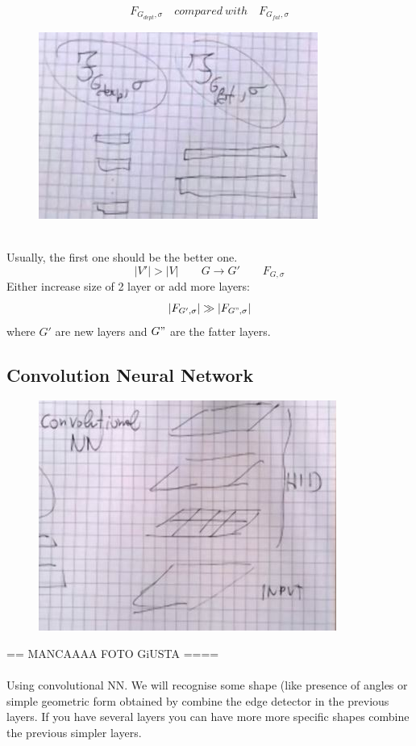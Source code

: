 \documentclass[../main.tex]{subfiles}
\begin{document}
$$
F_{G_{dept},\sigma} \quad compared \ with \quad F_{G_{fat},\sigma}
$$
\begin{figure}[h]
    \centering
    \includegraphics[width=0.4\linewidth]{../img/lez24-img14.JPG}
    \caption{}
\end{figure}\\
Usually, the first one should be the better one. \\
$$ |V'| > |V|  \qquad 
G \rightarrow G' \qquad F_{G,\sigma}
$$
Either increase size of 2 layer or add more layers:
$$
|F_{G', \sigma}| \gg |F_{G", \sigma}|
$$
where $G'$ are new layers and $G"$ are the fatter layers.
\newpage
\subsection{Convolution Neural Network}
\begin{figure}[h]
    \centering
    \includegraphics[width=0.4\linewidth]{../img/lez24-img15.JPG}
    \caption{}
\end{figure}
== MANCAAAA FOTO GiUSTA ====
\\\\
Using convolutional NN.
We will recognise some shape (like presence of angles or simple geometric form obtained by combine the edge detector in the previous layers.
If you have several layers you can have more more specific shapes combine the previous simpler layers.
\\\\
\end{document}
